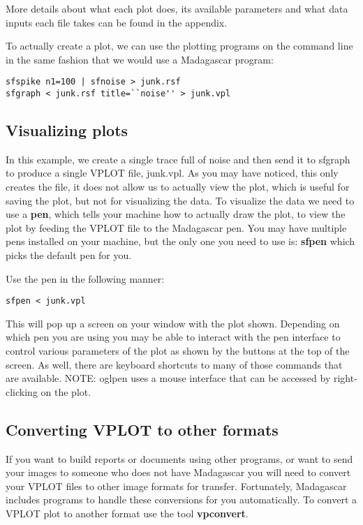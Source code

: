 More details about what each plot does, its available parameters and what data inputs each file takes can be found in the appendix.

To actually create a plot, we can use the plotting programs on the command line in the same fashion that we would use a Madagascar program:

\begin{verbatim}
sfspike n1=100 | sfnoise > junk.rsf
sfgraph < junk.rsf title=``noise'' > junk.vpl
\end{verbatim}

\subsection{Visualizing plots}

    In this example, we create a single trace full of noise and then send it to sfgraph to produce a single VPLOT file, junk.vpl.  As you may have noticed, this only creates the file, it does not allow us to actually view the plot, which is useful for saving the plot, but not for visualizing the data.  To visualize the data we need to use a \textbf{pen}, which tells your machine how to actually draw the plot, to view the plot by feeding the VPLOT file to the Madagascar pen. You may have multiple pens installed on your machine, but the only one you need to use is: \textbf{sfpen} which picks the default pen for you.

Use the pen in the following manner:
\begin{verbatim}
sfpen < junk.vpl
\end{verbatim}
This will pop up a screen on your window with the plot shown.  Depending on which pen you are using you may be able to interact with the pen interface to control various parameters of the plot as shown by the buttons at the top of the screen.  As well, there are keyboard shortcuts to many of those commands that are available.  NOTE: oglpen uses a mouse interface that can be accessed by right-clicking on the plot.

\subsection{Converting VPLOT to other formats}

If you want to build reports or documents using other programs, or want to send your images to someone who does not have Madagascar you will need to convert your VPLOT files to other image formats for transfer.  Fortunately, Madagascar includes programs to handle these conversions for you automatically.  To convert a VPLOT plot to another format use the tool \textbf{vpconvert}.  


